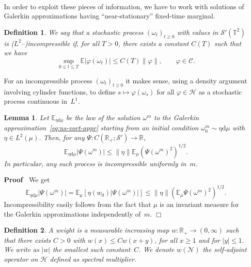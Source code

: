 \documentclass{article}
\newcommand{\mathd}{\mathrm{d}}
\newcommand{\tmem}[1]{{\em #1\/}}
\newenvironment{proof}{\noindent\textbf{Proof\ }}{\hspace*{\fill}$\Box$\medskip}
\newtheorem{definition}{Definition}
\newtheorem{lemma}{Lemma}
\begin{document}
\

In order to exploit these pieces of information, we have to work with
solutions of Galerkin approximations having ``near-stationary'' fixed-time
marginal.

\begin{definition}
  We say that a stochastic process $(\omega_t)_{t \geqslant 0}$ with values in
  $\mathcal{S}' (\mathbb{T}^2)$ is {\tmem{($L^2$--)incompressible}}
  if, for all $T > 0$, there exists a constant $C (T)$ such that we have
  \[ \sup_{0 \leqslant t \leqslant T} \mathbb{E} | \varphi (\omega_t) |
     \leqslant C (T) \| \varphi \|, \qquad \varphi \in \mathcal{C}. \]
\end{definition}

For an incompressible process $(\omega_t)_{t \geqslant 0}$ it makes sense,
using a density argument involving cylinder functions, to define $s \mapsto
\varphi (\omega_s)$ for all $\varphi \in \mathcal{H}$ as a stochastic process
continuous in~$L^1$.

\begin{lemma}
  \label{lem:est-eta}Let $\mathbb{E}_{\eta \mathd \mu}$ be the law of the
  solution $\omega^m$ to the Galerkin approximation~{\eqref{eq:ns-vort-appr}}
  starting from an initial condition $\omega^m_0 \sim \eta \mathd \mu$ with
  $\eta \in L^2 (\mu)$. Then, for any $\Psi : C (\mathbb{R}_+ ; \mathcal{S}')
  \rightarrow \mathbb{R}$,
  \[ \mathbb{E}_{\eta \mathd \mu} | \Psi (\omega^m) | \leqslant \| \eta \|
     \mathbb{E}_{\mu} (\Psi (\omega^m)^2)^{1 / 2} . \]
  In particular, any such process is incompressible uniformly in~$m$.
\end{lemma}

\begin{proof}
  We get
  \[ \mathbb{E}_{\eta \mathd \mu} | \Psi (\omega^m) | =\mathbb{E}_{\mu} [\eta
     (w_0) | \Psi (\omega^m) |] \leqslant \| \eta \| (\mathbb{E}_{\mu} \Psi
     (\omega^m)^2)^{1 / 2} . \]
  Incompressibility easily follows from the fact that $\mu$ is an invariant
  measure for the Galerkin approximations independently of~$m$.
\end{proof}

\begin{definition}
  A {\tmem{weight}} is a measurable increasing map $w : \mathbb{R}_+
  \rightarrow (0, \infty)$ such that there exists $C > 0$ with $w (x)
  \leqslant C w (x + y)$, for all $x \geqslant 1$ and for $| y | \leqslant 1$.
  We write as $| w |$ the smallest such constant~$C$. We denote $w
  (\mathcal{N})$ the self-adjoint operator on $\mathcal{H}$ defined as
  spectral multiplier.
\end{definition}
\end{document}
